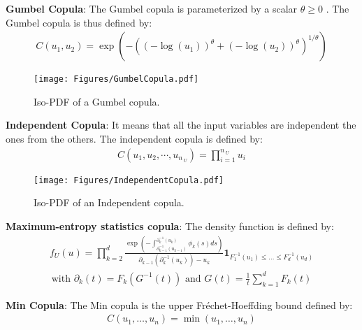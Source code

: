 {  {\bf Gumbel Copula}: The Gumbel copula is parameterized by a scalar $\theta \geq 0 $ . The Gumbel copula is thus defined by:
  \begin{align*}
    C(u_1, u_2) =\displaystyle \exp\left(-\left((-\log(u_1))^{\theta}+(-\log(u_2))^{\theta}\right)^{1/\theta}\right)
  \end{align*}



  \begin{figure}[H]
    \begin{center}
      \texttt{[image: Figures/GumbelCopula.pdf]}
      \caption{Iso-PDF of a  Gumbel copula.}
    \end{center}
  \end{figure}


  {\bf Independent Copula}: It means that all the input variables are independent the ones from the others. The independent copula is defined by:
  \begin{align*}
    C(u_1,u_2,\cdots,u_{n_{\:U}}) = \prod_{i=1}^{n_{\:U}} u_i
  \end{align*}


  \begin{figure}[H]
    \begin{center}
      \texttt{[image: Figures/IndependentCopula.pdf]}
      \caption{Iso-PDF of an Independent copula.}
    \end{center}
  \end{figure}


  {\bf Maximum-entropy statistics copula}: The density function is defined by:
  \begin{align*}
    f_U(u) = \prod\limits_{k=2}^d \frac{\exp\left(-\int_{\partial_{k-1}^{-1}(u_{k-1})}^{\partial_k^{-1}(u_k)} \phi_k(s) ds\right)}{\partial_{k-1}(\partial_k^{-1}(u_k))-u_k} \mathbf{1}_{F_1^{-1}(u_1) \leq \dots \leq F_d^{-1}(u_d)}
  \end{align*}
  \begin{align*}
    \text{with } \partial_k(t) = F_k(G^{-1}(t)) \text{ and } G(t) = \frac{1}{t} \sum\limits_{k=1}^d F_k(t)
  \end{align*}


  {\bf Min Copula}: The Min copula is the upper Fr\'echet-Hoeffding bound defined by:
  \begin{align*}
    C(u_1, \dots, u_n) = \min(u_1,\dots,u_n)
  \end{align*}


}
